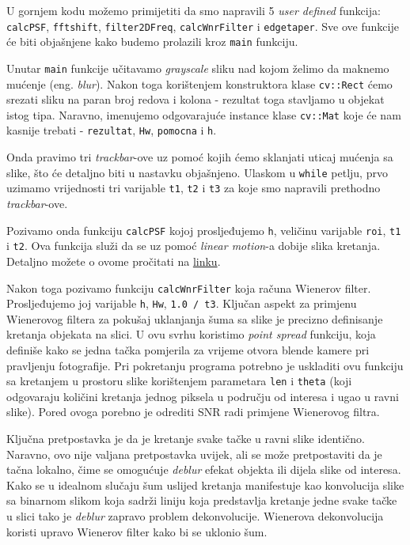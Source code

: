 \documentclass[a4paper, 12pt]{article}
\begin{document}
U gornjem kodu možemo primijetiti da smo napravili 5 \textit{user defined} funkcija: \lstinline{calcPSF}, \lstinline{fftshift}, \lstinline{filter2DFreq}, \lstinline{calcWnrFilter} i \lstinline{edgetaper}. Sve ove funkcije će biti objašnjene kako budemo prolazili kroz \lstinline{main} funkciju.

Unutar \lstinline{main} funkcije učitavamo \textit{grayscale} sliku nad kojom želimo da maknemo mućenje (eng. \textit{blur}). Nakon toga korištenjem konstruktora klase \lstinline{cv::Rect} ćemo srezati sliku na paran broj redova i kolona - rezultat toga stavljamo u objekat istog tipa. Naravno, imenujemo odgovarajuće instance klase \lstinline{cv::Mat} koje će nam kasnije trebati - \lstinline{rezultat}, \lstinline{Hw}, \lstinline{pomocna} i \lstinline{h}.

Onda pravimo tri \textit{trackbar}-ove uz pomoć kojih ćemo sklanjati uticaj mućenja sa slike, što će detaljno biti u nastavku objašnjeno. Ulaskom u \lstinline{while} petlju, prvo uzimamo vrijednosti tri varijable \lstinline{t1}, \lstinline{t2} i \lstinline{t3} za koje smo napravili prethodno \textit{trackbar}-ove. 

Pozivamo onda funkciju \lstinline{calcPSF} kojoj prosljeđujemo \lstinline{h}, veličinu varijable \lstinline{roi}, \lstinline{t1} i \lstinline{t2}. Ova funkcija služi da se uz pomoć \textit{linear motion}-a dobije slika kretanja. Detaljno možete o ovome pročitati na \href{https://docs.opencv.org/4.x/d1/dfd/tutorial_motion_deblur_filter.html}{linku}. 

Nakon toga pozivamo funkciju \lstinline{calcWnrFilter} koja računa Wienerov filter. Prosljeđujemo joj varijable \lstinline{h}, \lstinline{Hw}, \lstinline{1.0 / t3}. Ključan aspekt za primjenu Wienerovog filtera za pokušaj uklanjanja šuma sa slike je precizno definisanje kretanja objekata na slici. U ovu svrhu koristimo \textit{point spread} funkciju, koja definiše kako se jedna tačka pomjerila za vrijeme otvora blende kamere pri pravljenju fotografije. Pri pokretanju programa potrebno je uskladiti ovu funkciju sa kretanjem u prostoru slike korištenjem parametara \lstinline{len} i \lstinline{theta} (koji odgovaraju količini kretanja jednog piksela u području od interesa i ugao u ravni slike). Pored ovoga porebno je odrediti SNR radi primjene Wienerovog filtra.

Ključna pretpostavka je da je kretanje svake tačke u ravni slike identično. Naravno, ovo nije valjana pretpostavka uvijek, ali se može pretpostaviti da je tačna lokalno, čime se omogućuje \textit{deblur} efekat objekta ili dijela slike od interesa. Kako se u idealnom slučaju šum uslijed kretanja manifestuje kao konvolucija slike sa binarnom slikom koja sadrži liniju koja predstavlja kretanje jedne svake tačke u slici tako je \textit{deblur} zapravo problem dekonvolucije. Wienerova dekonvolucija koristi upravo Wienerov filter kako bi se uklonio šum. 
\end{document}
